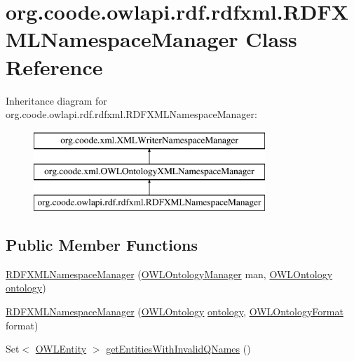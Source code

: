 \hypertarget{classorg_1_1coode_1_1owlapi_1_1rdf_1_1rdfxml_1_1_r_d_f_x_m_l_namespace_manager}{\section{org.\-coode.\-owlapi.\-rdf.\-rdfxml.\-R\-D\-F\-X\-M\-L\-Namespace\-Manager Class Reference}
\label{classorg_1_1coode_1_1owlapi_1_1rdf_1_1rdfxml_1_1_r_d_f_x_m_l_namespace_manager}
}
Inheritance diagram for org.\-coode.\-owlapi.\-rdf.\-rdfxml.\-R\-D\-F\-X\-M\-L\-Namespace\-Manager\-:\begin{figure}[H]
\begin{center}
\leavevmode
\includegraphics[height=3.000000cm]{classorg_1_1coode_1_1owlapi_1_1rdf_1_1rdfxml_1_1_r_d_f_x_m_l_namespace_manager}
\end{center}
\end{figure}
\subsection*{Public Member Functions}
\begin{DoxyCompactItemize}
\item 
\hyperlink{classorg_1_1coode_1_1owlapi_1_1rdf_1_1rdfxml_1_1_r_d_f_x_m_l_namespace_manager_a5603d8dc8aae9bf062d042b2822d2838}{R\-D\-F\-X\-M\-L\-Namespace\-Manager} (\hyperlink{interfaceorg_1_1semanticweb_1_1owlapi_1_1model_1_1_o_w_l_ontology_manager}{O\-W\-L\-Ontology\-Manager} man, \hyperlink{interfaceorg_1_1semanticweb_1_1owlapi_1_1model_1_1_o_w_l_ontology}{O\-W\-L\-Ontology} \hyperlink{classorg_1_1coode_1_1xml_1_1_o_w_l_ontology_x_m_l_namespace_manager_aeb4906fd8488526e3e5dbff9393a0571}{ontology})
\item 
\hyperlink{classorg_1_1coode_1_1owlapi_1_1rdf_1_1rdfxml_1_1_r_d_f_x_m_l_namespace_manager_aa448ccd3f664a62fbc1f92cd1b86219f}{R\-D\-F\-X\-M\-L\-Namespace\-Manager} (\hyperlink{interfaceorg_1_1semanticweb_1_1owlapi_1_1model_1_1_o_w_l_ontology}{O\-W\-L\-Ontology} \hyperlink{classorg_1_1coode_1_1xml_1_1_o_w_l_ontology_x_m_l_namespace_manager_aeb4906fd8488526e3e5dbff9393a0571}{ontology}, \hyperlink{classorg_1_1semanticweb_1_1owlapi_1_1model_1_1_o_w_l_ontology_format}{O\-W\-L\-Ontology\-Format} format)
\item 
Set$<$ \hyperlink{interfaceorg_1_1semanticweb_1_1owlapi_1_1model_1_1_o_w_l_entity}{O\-W\-L\-Entity} $>$ \hyperlink{classorg_1_1coode_1_1owlapi_1_1rdf_1_1rdfxml_1_1_r_d_f_x_m_l_namespace_manager_af9580b29c73445c919dc3818775af17a}{get\-Entities\-With\-Invalid\-Q\-Names} ()
\end{DoxyCompactItemize}
